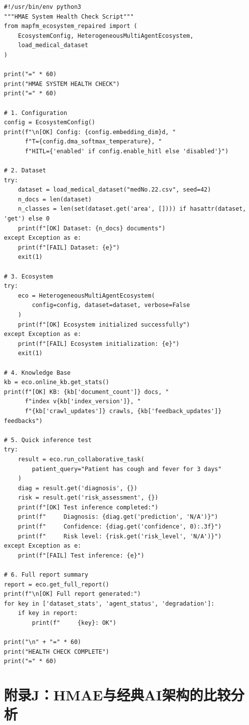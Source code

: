 \documentclass[11pt,a4paper]{ctexart}
\begin{document}
\begin{verbatim}
#!/usr/bin/env python3
"""HMAE System Health Check Script"""
from mapfm_ecosystem_repaired import (
    EcosystemConfig, HeterogeneousMultiAgentEcosystem,
    load_medical_dataset
)

print("=" * 60)
print("HMAE SYSTEM HEALTH CHECK")
print("=" * 60)

# 1. Configuration
config = EcosystemConfig()
print(f"\n[OK] Config: {config.embedding_dim}d, "
      f"T={config.dma_softmax_temperature}, "
      f"HITL={'enabled' if config.enable_hitl else 'disabled'}")

# 2. Dataset
try:
    dataset = load_medical_dataset("medNo.22.csv", seed=42)
    n_docs = len(dataset)
    n_classes = len(set(dataset.get('area', []))) if hasattr(dataset, 'get') else 0
    print(f"[OK] Dataset: {n_docs} documents")
except Exception as e:
    print(f"[FAIL] Dataset: {e}")
    exit(1)

# 3. Ecosystem
try:
    eco = HeterogeneousMultiAgentEcosystem(
        config=config, dataset=dataset, verbose=False
    )
    print(f"[OK] Ecosystem initialized successfully")
except Exception as e:
    print(f"[FAIL] Ecosystem initialization: {e}")
    exit(1)

# 4. Knowledge Base
kb = eco.online_kb.get_stats()
print(f"[OK] KB: {kb['document_count']} docs, "
      f"index v{kb['index_version']}, "
      f"{kb['crawl_updates']} crawls, {kb['feedback_updates']} feedbacks")

# 5. Quick inference test
try:
    result = eco.run_collaborative_task(
        patient_query="Patient has cough and fever for 3 days"
    )
    diag = result.get('diagnosis', {})
    risk = result.get('risk_assessment', {})
    print(f"[OK] Test inference completed:")
    print(f"     Diagnosis: {diag.get('prediction', 'N/A')}")
    print(f"     Confidence: {diag.get('confidence', 0):.3f}")
    print(f"     Risk level: {risk.get('risk_level', 'N/A')}")
except Exception as e:
    print(f"[FAIL] Test inference: {e}")

# 6. Full report summary
report = eco.get_full_report()
print(f"\n[OK] Full report generated:")
for key in ['dataset_stats', 'agent_status', 'degradation']:
    if key in report:
        print(f"     {key}: OK")

print("\n" + "=" * 60)
print("HEALTH CHECK COMPLETE")
print("=" * 60)
\end{verbatim}

\newpage

\section*{附录J：HMAE与经典AI架构的比较分析}
\end{document}
